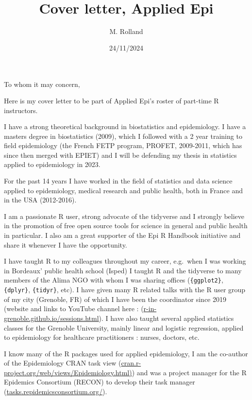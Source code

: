 \documentclass[
  letterpaper,
  DIV=11,
  numbers=noendperiod]{scrartcl}
\title{Cover letter, Applied Epi}
\author{M. Rolland}
\date{24/11/2024}
\begin{document}
\maketitle
\ifdefined\Shaded\renewenvironment{Shaded}{\begin{tcolorbox}[frame hidden, borderline west={3pt}{0pt}{shadecolor}, interior hidden, sharp corners, enhanced, breakable, boxrule=0pt]}{\end{tcolorbox}}\fi

To whom it may concern,

Here is my cover letter to be part of Applied Epi's roster of part-time
R instructors.

I have a strong theoretical background in biostatistics and
epidemiology. I have a masters degree in biostatistics (2009), which I
followed with a 2 year training to field epidemiology (the French FETP
program, PROFET, 2009-2011, which has since then merged with EPIET) and
I will be defending my thesis in statistics applied to epidemiology in
2023.

For the past 14 years I have worked in the field of statistics and data
science applied to epidemiology, medical research and public health,
both in France and in the USA (2012-2016).

I am a passionate R user, strong advocate of the tidyverse and I
strongly believe in the promotion of free open source tools for science
in general and public health in particular. I also am a great supporter
of the Epi R Handbook initiative and share it whenever I have the
opportunity.

I have taught R to my colleagues throughout my career, e.g.~when I was
working in Bordeaux' public health school (Isped) I taught R and the
tidyverse to many members of the Alima NGO with whom I was sharing
offices (\texttt{\{ggplot2\}}, \texttt{\{dplyr\}}, \texttt{\{tidyr\}},
etc). I have given many R related talks with the R user group of my city
(Grenoble, FR) of which I have been the coordinator since 2019 (website
and links to YouTube channel here :
(\url{r-in-grenoble.github.io/sessions.html}). I have also taught
several applied statistics classes for the Grenoble University, mainly
linear and logistic regression, applied to epidemiology for healthcare
practitioners : nurses, doctors, etc.

I know many of the R packages used for applied epidemiology, I am the
co-author of the Epidemiology CRAN task view
(\href{cran.r-project.org/web/views/Epidemiology.html}{cran.r-project.org/web/views/Epidemiology.html)})
and was a project manager for the R Epidemics Consortium (RECON) to
develop their task manager (\url{tasks.repidemicsconsortium.org/}).
\end{document}
